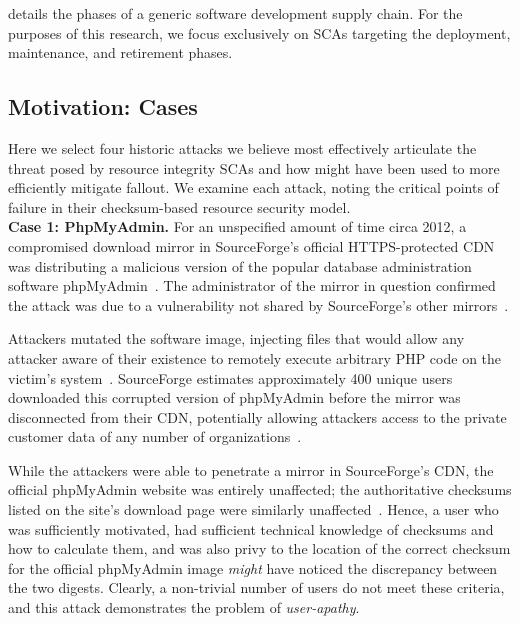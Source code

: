  details the phases of a generic software development supply
chain. For the purposes of this research, we focus exclusively on SCAs targeting
the deployment, maintenance, and retirement phases.

\subsection{Motivation: Cases}

Here we select four historic attacks we believe most effectively articulate the
threat posed by resource integrity SCAs and how \SYSTEM{} might have been used
to more efficiently mitigate fallout. We examine each attack, noting the
critical points of failure in their checksum-based resource security model. \\

\noindent\textbf{Case 1: PhpMyAdmin.} For an unspecified amount of time circa
2012, a compromised download mirror in SourceForge's official HTTPS-protected
CDN was distributing a malicious version of the popular database administration
software phpMyAdmin~\cite{SCA-PMA3}. The administrator of the mirror in question
confirmed the attack was due to a vulnerability not shared by SourceForge's
other mirrors~\cite{SCA-PMA2}.

Attackers mutated the software image, injecting files that would allow any
attacker aware of their existence to remotely execute arbitrary PHP code on the
victim's system~\cite{SCA-PMA1}. SourceForge estimates approximately 400 unique
users downloaded this corrupted version of phpMyAdmin before the mirror was
disconnected from their CDN, potentially allowing attackers access to the
private customer data of any number of organizations~\cite{SCA-PMA2}.

While the attackers were able to penetrate a mirror in SourceForge's CDN, the
official phpMyAdmin website was entirely unaffected; the authoritative checksums
listed on the site's download page were similarly unaffected~\cite{SCA-PMA2}.
Hence, a user who was sufficiently motivated, had sufficient technical knowledge
of checksums and how to calculate them, and was also privy to the location of
the correct checksum for the official phpMyAdmin image \emph{might} have noticed
the discrepancy between the two digests. Clearly, a non-trivial number of users
do not meet these criteria, and this attack demonstrates the problem of \emph{user-apathy}. \\

